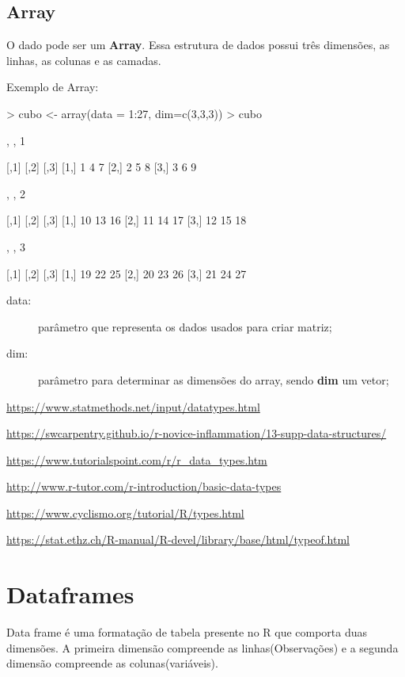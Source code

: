 \documentclass[12pt,a4paper,oneside]{erdc}
\begin{document}
\subsection{Array}

O dado pode ser um \textbf{Array}. Essa estrutura de dados possui três dimensões, as linhas, as colunas e as camadas. 

Exemplo de Array:
\begin{Schunk}
\begin{Sinput}
> cubo <- array(data = 1:27, dim=c(3,3,3))
> cubo
\end{Sinput}
\begin{Soutput}
, , 1

     [,1] [,2] [,3]
[1,]    1    4    7
[2,]    2    5    8
[3,]    3    6    9

, , 2

     [,1] [,2] [,3]
[1,]   10   13   16
[2,]   11   14   17
[3,]   12   15   18

, , 3

     [,1] [,2] [,3]
[1,]   19   22   25
[2,]   20   23   26
[3,]   21   24   27
\end{Soutput}
\end{Schunk}

       \begin{description}
       \item [data:] parâmetro que representa os dados usados para criar matriz;
       \item [dim:] parâmetro para determinar as dimensões do array, sendo \textbf{dim} um vetor;
       \end{description}

\url{https://www.statmethods.net/input/datatypes.html}

\url{https://swcarpentry.github.io/r-novice-inflammation/13-supp-data-structures/}

\url{https://www.tutorialspoint.com/r/r_data_types.htm}

\url{http://www.r-tutor.com/r-introduction/basic-data-types}

\url{https://www.cyclismo.org/tutorial/R/types.html}

\url{https://stat.ethz.ch/R-manual/R-devel/library/base/html/typeof.html}

\section{Dataframes}

Data frame é uma formatação de tabela presente no R que comporta duas dimensões. A primeira dimensão compreende as linhas(Observações) e a segunda dimensão compreende as colunas(variáveis). 
\end{document}
